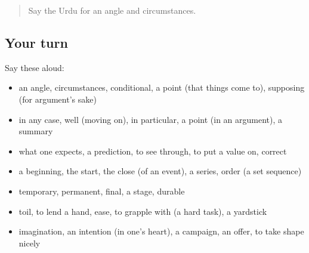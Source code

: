 \begin{quote}
Say the Urdu for an angle and circumstances.
\end{quote}

\subsection*{Your turn}
Say these aloud:

\begin{itemize}
\raggedright
  \item an angle, circumstances, conditional, a point (that things come to), supposing (for argument's sake)
  \item in any case, well (moving on), in particular, a point (in an argument), a summary
  \item what one expects, a prediction, to see through, to put a value on, correct
  \item a beginning, the start, the close (of an event), a series, order (a set sequence)
  \item temporary, permanent, final, a stage, durable
  \item toil, to lend a hand, ease, to grapple with (a hard task), a yardstick
  \item imagination, an intention (in one's heart), a campaign, an offer, to take shape nicely
\end{itemize}

